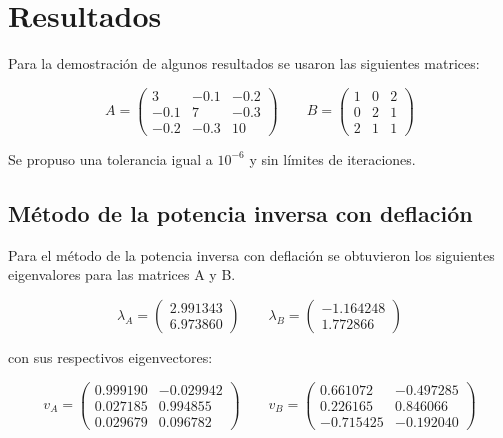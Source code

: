\section{Resultados}

Para la demostración de algunos resultados se usaron las siguientes matrices:

\begin{equation}
    A = \begin{pmatrix}
        3    & -0.1 & -0.2 \\
        -0.1 & 7    & -0.3 \\
        -0.2 & -0.3 & 10
    \end{pmatrix}
    \qquad
    B = \begin{pmatrix}
        1 & 0 & 2 \\
        0 & 2 & 1 \\
        2 & 1 & 1
    \end{pmatrix}
\end{equation}

Se propuso una tolerancia igual a $10^{-6}$ y sin límites de iteraciones.

\subsection{Método de la potencia inversa con deflación}

Para el método de la potencia inversa con deflación se obtuvieron los siguientes eigenvalores para las matrices A y B.

\begin{equation*}
    \lambda_A = \begin{pmatrix}
        2.991343 \\
        6.973860
    \end{pmatrix}
    \qquad
    \lambda_B = \begin{pmatrix}
        -1.164248 \\
        1.772866
    \end{pmatrix}
\end{equation*}

con sus respectivos eigenvectores:

\begin{equation*}
    v_A = \begin{pmatrix}
        0.999190 & -0.029942 \\
        0.027185 & 0.994855  \\
        0.029679 & 0.096782
    \end{pmatrix}
    \qquad
    v_B = \begin{pmatrix}
        0.661072  & -0.497285 \\
        0.226165  & 0.846066  \\
        -0.715425 & -0.192040
    \end{pmatrix}
\end{equation*}


